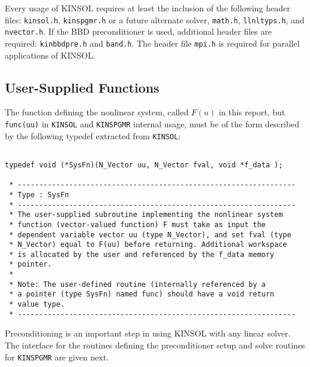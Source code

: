 \documentclass[11pt]{article}
\begin{document}
Every usage of KINSOL requires at least the inclusion of the following header
files:  {\tt kinsol.h}, {\tt kinspgmr.h} or a future alternate solver, 
{\tt math.h}, {\tt llnltyps.h}, and {\tt nvector.h}. If the BBD preconditioner is
used, additional header files are required: {\tt kinbbdpre.h} and {\tt band.h}.
The header file {\tt mpi.h} is required for parallel applications of KINSOL.



\subsection{User-Supplied Functions}

The function defining the nonlinear system, called $F(u)$ in this report,
but {\tt func(uu)} in {\tt KINSOL} and {\tt KINSPGMR} internal usage, must be of
the form described by the following typedef extracted from {\tt KINSOL}:

\small
\begin{verbatim}

typedef void (*SysFn)(N_Vector uu, N_Vector fval, void *f_data );

 * -----------------------------------------------------------------
 * Type : SysFn
 * -----------------------------------------------------------------
 * The user-supplied subroutine implementing the nonlinear system
 * function (vector-valued function) F must take as input the
 * dependent variable vector uu (type N_Vector), and set fval (type
 * N_Vector) equal to F(uu) before returning. Additional workspace
 * is allocated by the user and referenced by the f_data memory
 * pointer.
 * 
 * Note: The user-defined routine (internally referenced by a
 * a pointer (type SysFn) named func) should have a void return
 * value type.
 * -----------------------------------------------------------------

\end{verbatim}
\normalsize

Preconditioning is an important step in using KINSOL with any linear
solver. The interface for the routines defining the preconditioner
setup and solve routines for {\tt KINSPGMR} are given next.
\end{document}
